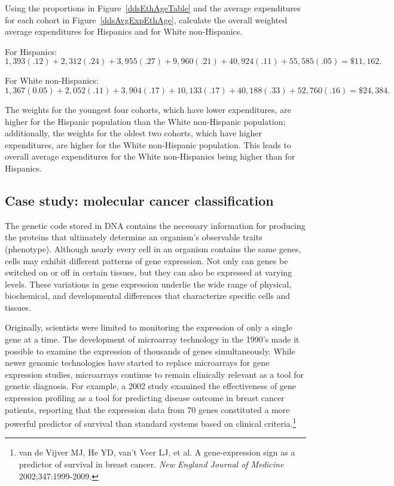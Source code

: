 \begin{examplewrap}
\begin{nexample}{Using the proportions in Figure~\ref{ddsEthAgeTable} and the average expenditures for each cohort in Figure~\ref{ddsAvgExpEthAge}, calculate the overall weighted average expenditures for Hispanics and for White non-Hispanics.\footnotemark}

For Hispanics:
\[1,393(.12) + 2,312(.24) + 3,955(.27) + 9,960(.21) + 40,924(.11) + 55,585(.05) = \$11,162. \]

For White non-Hispanics:
\[1,367(0.05) + 2,052(.11) + 3,904(.17) + 10,133(.17) + 40,188(.33) + 52,760(.16) = \$24,384. \]	

The weights for the youngest four cohorts, which have lower expenditures, are higher for the Hispanic population than the White non-Hispanic population; additionally, the weights for the oldest two cohorts, which have higher expenditures, are higher for the White non-Hispanic population. This leads to overall average expenditures for the White non-Hispanics being higher than for Hispanics.
\end{nexample}
\end{examplewrap}


\textD{\newpage}


\subsection{Case study: molecular cancer classification}

The genetic code stored in DNA contains the necessary information for producing the proteins that ultimately determine an organism's observable traits (phenotype). Although nearly every cell in an organism contains the same genes, cells may exhibit different patterns of gene expression. Not only can genes be switched on or off in certain tissues, but they can also be expressed at varying levels. These variations in gene expression underlie the wide range of physical, biochemical, and developmental differences that characterize specific cells and tissues.

Originally, scientists were limited to monitoring the expression of only a single gene at a time. The development of microarray technology in the 1990's made it possible to examine the expression of thousands of genes simultaneously. While newer genomic technologies have started to replace microarrays for gene expression studies, microarrays continue to remain clinically relevant as a tool for genetic diagnosis. For example, a 2002 study examined the effectiveness of gene expression profiling as a tool for predicting disease outcome in breast cancer patients, reporting that the expression data from 70 genes constituted a more powerful predictor of survival than standard systems based on clinical criteria.\footnote{van de Vijver MJ, He YD, van't Veer LJ, et al. A gene-expression sign as a predictor of survival in breast cancer. \textit{New England Journal of Medicine} 2002;347:1999-2009.} 

